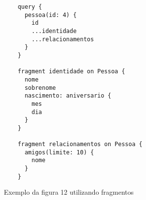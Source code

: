 \begin{figure}[H]
  \centering
  \begin{verbatim}
    query {
      pessoa(id: 4) {
        id
        ...identidade
        ...relacionamentos
      }
    }

    fragment identidade on Pessoa {
      nome
      sobrenome
      nascimento: aniversario {
        mes
        dia
      }
    }

    fragment relacionamentos on Pessoa {
      amigos(limite: 10) {
        nome
      }
    }
  \end{verbatim}
  \caption{Exemplo da figura 12 utilizando fragmentos}
\end{figure}
